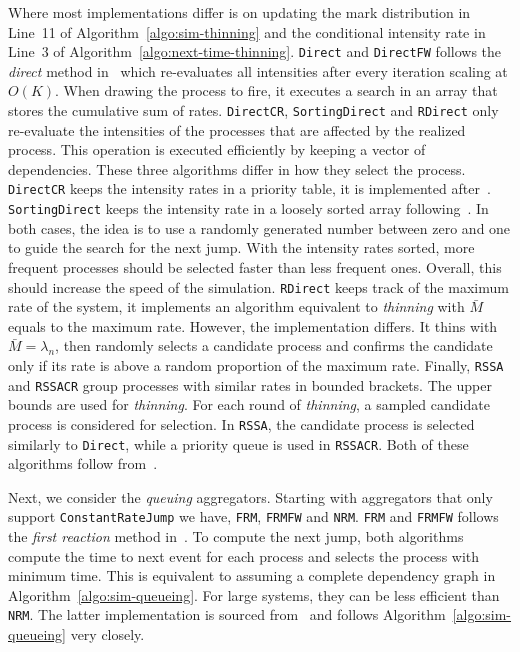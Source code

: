 \documentclass{juliacon}
\begin{document}
Where most implementations differ is on updating the mark distribution in Line~11 of Algorithm~\ref{algo:sim-thinning} and the conditional intensity rate in Line~3 of Algorithm~\ref{algo:next-time-thinning}. \texttt{Direct} and \texttt{DirectFW} follows the \textit{direct} method in~\cite{gillespie1976} which re-evaluates all intensities after every iteration scaling at \( O(K) \). When drawing the process to fire, it executes a search in an array that stores the cumulative sum of rates. \texttt{DirectCR}, \texttt{SortingDirect} and \texttt{RDirect} only re-evaluate the intensities of the processes that are affected by the realized process. This operation is executed efficiently by keeping a vector of dependencies. These three algorithms differ in how they select the process. \texttt{DirectCR} keeps the intensity rates in a priority table, it is implemented after~\cite{slepoy2008}. \texttt{SortingDirect} keeps the intensity rate in a loosely sorted array following~\cite{mccollum2006}. In both cases, the idea is to use a randomly generated number between zero and one to guide the search for the next jump. With the intensity rates sorted, more frequent processes should be selected faster than less frequent ones. Overall, this should increase the speed of the simulation. \texttt{RDirect} keeps track of the maximum rate of the system, it implements an algorithm equivalent to \textit{thinning} with \( \bar{M} \) equals to the maximum rate. However, the implementation differs. It thins with \( \bar{M} = \lambda_n \), then randomly selects a candidate process and confirms the candidate only if its rate is above a random proportion of the maximum rate. Finally, \texttt{RSSA} and \texttt{RSSACR} group processes with similar rates in bounded brackets. The upper bounds are used for \textit{thinning}. For each round of \textit{thinning}, a sampled candidate process is considered for selection. In \texttt{RSSA}, the candidate process is selected similarly to \texttt{Direct}, while a priority queue is used in \texttt{RSSACR}. Both of these algorithms follow from~\cite{thanh2014,thanh2017}.

Next, we consider the \textit{queuing} aggregators. Starting with aggregators that only support \texttt{ConstantRateJump} we have, \texttt{FRM}, \texttt{FRMFW} and \texttt{NRM}. \texttt{FRM} and \texttt{FRMFW} follows the \textit{first reaction} method in~\cite{gillespie1976}. To compute the next jump, both algorithms compute the time to next event for each process and selects the process with minimum time. This is equivalent to assuming a complete dependency graph in Algorithm~\ref{algo:sim-queueing}. For large systems, they can be less efficient than \texttt{NRM}. The latter implementation is sourced from~\cite{gibson2000} and follows Algorithm~\ref{algo:sim-queueing} very closely.
\end{document}
